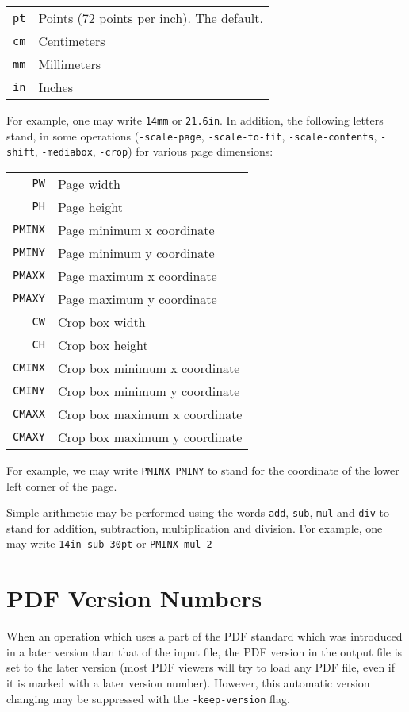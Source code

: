 \documentclass{book}
\begin{document}
\begin{table}[h]
\centering
\begin{tabular}{rl}
  \texttt{pt} & Points (72 points per inch). The default. \\
  \texttt{cm} & Centimeters \\
  \texttt{mm} & Millimeters \\
  \texttt{in} & Inches \\
\end{tabular}
\end{table}

\noindent For example, one may write \texttt{14mm} or \texttt{21.6in}. In addition, the following letters stand, in some operations (\texttt{-scale-page}, \texttt{-scale-to-fit}, \texttt{-scale-contents}, \texttt{-shift}, \texttt{-mediabox}, \texttt{-crop}) for various page dimensions:

\begin{table}[h]
\centering
\begin{tabular}{rl}
  \texttt{PW} & Page width\\
  \texttt{PH} & Page height\\
  \texttt{PMINX} & Page minimum x coordinate\\
  \texttt{PMINY} & Page minimum y coordinate\\
  \texttt{PMAXX} & Page maximum x coordinate\\
  \texttt{PMAXY} & Page maximum y coordinate\\
  \texttt{CW} & Crop box width\\
  \texttt{CH} & Crop box height\\
  \texttt{CMINX} & Crop box minimum x coordinate\\
  \texttt{CMINY} & Crop box minimum y coordinate\\
  \texttt{CMAXX} & Crop box maximum x coordinate\\
  \texttt{CMAXY} & Crop box maximum y coordinate
\end{tabular}
\end{table}

\noindent For example, we may write \texttt{PMINX PMINY} to stand for the coordinate of the lower left corner of the page.

Simple arithmetic may be performed using the words \texttt{add}, \texttt{sub}, \texttt{mul} and \texttt{div} to stand for addition, subtraction, multiplication and division. For example, one may write \texttt{14in sub 30pt} or \texttt{PMINX mul 2}

\section{PDF Version Numbers}
When an operation which uses a part of the PDF standard which was introduced in
a later version than that of the input file, the PDF version in the output file
is set to the later version (most PDF viewers will try to load any PDF file,
even if it is marked with a later version number). However, this automatic
version changing may be suppressed with the \texttt{-keep-version} flag.
\end{document}
